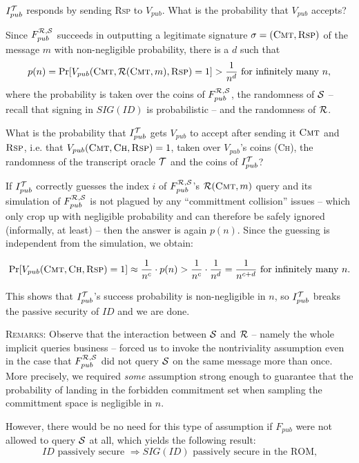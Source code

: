 \documentclass[12pt,twoside]{article}
\begin{document}
\begin{enumerate}
$I_{pub}^{\mathcal{T}}$ responds by sending \textsc{Rsp} to $V_{pub}$. What is the 
probability that $V_{pub}$ accepts? 

Since $F_{pub}^{\mathcal{R},\mathcal{S}}$ succeeds in outputting a legitimate signature
$\sigma = (\textsc{Cmt},\textsc{Rsp})$ of the message $m$ with non-negligible 
probability, there is a $d$ such that
\[ 
p(n) = \text{Pr}[V_{pub}(\textsc{Cmt},\mathcal{R}(\textsc{Cmt},m),
\textsc{Rsp}) = 1] > \frac{1}{n^d} \text { for infinitely many } n,
\] 
where the probability is taken over the coins of $F_{pub}^{\mathcal{R},\mathcal{S}}$,  
the randomness of $\mathcal{S}$ -- recall that signing in $SIG(ID)$ is probabilistic
-- and the randomness of $\mathcal{R}$. 

What is the probability that $I_{pub}^{\mathcal{T}}$ gets $V_{pub}$ to accept after
sending it $\textsc{Cmt}$ and $\textsc{Rsp}$, i.e. that 
$V_{pub}(\textsc{Cmt},\textsc{Ch},\textsc{Rsp}) = 1$, taken over $V_{pub}$'s 
coins (\textsc{Ch}), the randomness of the transcript oracle $\mathcal{T}$ and the 
coins of $I_{pub}^{\mathcal{T}}$? 

If $I_{pub}^{\mathcal{T}}$ correctly guesses the index $i$ of $F_{pub}^{\mathcal{R},\mathcal{S}}$'s 
$\mathcal{R}(\textsc{Cmt},m)$ query and its simulation of $F_{pub}^{\mathcal{R},\mathcal{S}}$
is not plagued by any ``committment collision'' issues -- which only crop up
with negligible probability and can therefore be safely ignored (informally,
at least) -- then the answer is again $p(n)$. Since the guessing is
independent from the simulation, we obtain:

\[
\text{Pr}[V_{pub}(\textsc{Cmt},\textsc{Ch},\textsc{Rsp}) = 1] \approx
\frac{1}{n^c}\cdot p(n) > \frac{1}{n^c}\cdot \frac{1}{n^d} = \frac{1}{n^{c+d}}
\text{ for infinitely many } n.
\]

This shows that $I_{pub}^{\mathcal{T}}$'s success probability is non-negligible in $n$,
so $I_{pub}^{\mathcal{T}}$ breaks the passive security of $ID$ and we are done. 

\textsc{Remarks}: Observe that the interaction between $\mathcal{S}$ and $\mathcal{R}$ -- 
namely the whole implicit queries business -- forced us to invoke the 
nontriviality assumption even in the case that $F_{pub}^{\mathcal{R},\mathcal{S}}$ did not 
query $\mathcal{S}$ on the same message more than once. More precisely, we required 
{\it some} assumption strong enough to guarantee that the probability of 
landing in the forbidden commitment set when sampling the committment space is 
negligible in $n$.

However, there would be no need for this type of assumption if $F_{pub}$
were not allowed to query $\mathcal{S}$ at all, which yields the following result:
\[
ID \text{ passively secure } \Rightarrow SIG(ID) \text{ passively secure in 
the ROM,} 
\]


\end{enumerate}
\end{document}
